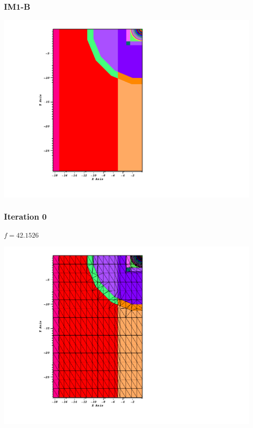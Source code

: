 \documentclass[]{beamer}
\begin{document}
\begin{frame}[t]\frametitle{IM1-B}
\centering
\includegraphics[scale = 0.3]{figures/IM1_filled_boundary0000.png}
\end{frame}

\begin{frame}[t]\frametitle{Iteration 0}
\begin{minipage}{0.15\textwidth}
\begin{footnotesize}
$f = 42.1526$
\end{footnotesize}
\end{minipage}
\begin{minipage}{0.8\textwidth}
\centering
\includegraphics[scale=0.3]{figures/IM1_pre_iterations0000.png}
\end{minipage}
\end{frame}
\end{document}
